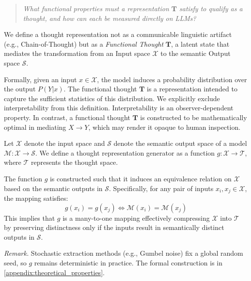 \begin{quote}
\itshape What functional properties must a representation $\mathbf{T}$ satisfy to qualify as a thought, and how can each be measured directly on LLMs?
\end{quote}

We define a thought representation not as a communicable linguistic artifact (e.g., Chain-of-Thought) but as a \emph{Functional Thought} $\mathbf{T}$, a latent state that mediates the transformation from an Input space $\mathcal{X}$ to the semantic Output space $\mathcal{S}$. 

Formally, given an input $x \in \mathcal{X}$, the model induces a probability distribution over the output $P(Y|x)$. The functional thought $\mathbf{T}$ is a representation intended to capture the sufficient statistics of this distribution. We explicitly exclude interpretability from this definition. Interpretability is an observer-dependent property. In contrast, a functional thought $\mathbf{T}$ is constructed to be mathematically optimal in mediating $X \to Y$, which may render it opaque to human inspection. 

\begin{definition}\label{def:thought-mapping}
Let $\mathcal{X}$ denote the input space and $\mathcal{S}$ denote the semantic output space of a model $\mathcal{M}: \mathcal{X} \to \mathcal{S}$. We define a thought representation generator as a function $g: \mathcal{X} \to \mathcal{T}$, where $\mathcal{T}$ represents the thought space.

The function $g$ is constructed such that it induces an equivalence relation on $\mathcal{X}$ based on the semantic outputs in $\mathcal{S}$. Specifically, for any pair of inputs $x_i, x_j \in \mathcal{X}$, the mapping satisfies:
\begin{equation}
    g(x_i) = g(x_j) \iff \mathcal{M}(x_i) = \mathcal{M}(x_j)
\end{equation}
This implies that $g$ is a many-to-one mapping effectively compressing $\mathcal{X}$ into $\mathcal{T}$ by preserving distinctness only if the inputs result in semantically distinct outputs in $\mathcal{S}$.
\end{definition}

\noindent\textit{Remark.} Stochastic extraction methods (e.g., Gumbel noise) fix a global random seed, so $g$ remains deterministic in practice. The formal construction is in \cref{appendix:theoretical_properties}.

